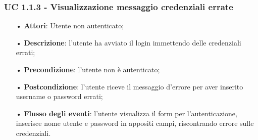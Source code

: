 \subsubsection{UC 1.1.3 - Visualizzazione messaggio credenziali errate}
\begin{itemize}
\item[•]\textbf{Attori}: Utente non autenticato;
\item[•]\textbf{Descrizione}: l'utente ha avviato il login immettendo delle credenziali errati;
\item[•]\textbf{Precondizione}: l'utente non è autenticato;
\item[•]\textbf{Postcondizione}: l'utente riceve il messaggio d'errore per aver inserito username o password errati;
\item[•]\textbf{Flusso degli eventi}: l'utente visualizza il form per l'autenticazione, inserisce nome utente e password in appositi campi, riscontrando errore sulle credenziali.
\end{itemize}

